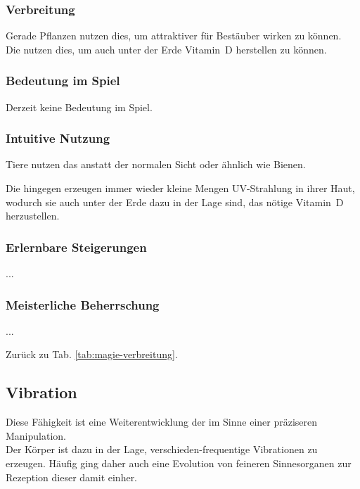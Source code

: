 \subsubsection{Verbreitung}
Gerade Pflanzen nutzen dies, um attraktiver für Bestäuber wirken zu können. \\
Die  nutzen dies, um auch unter der Erde Vitamin~D herstellen zu können.

\subsubsection{Bedeutung im Spiel}
Derzeit keine Bedeutung im Spiel.

\subsubsection{Intuitive Nutzung}
Tiere nutzen das \zB anstatt der normalen Sicht oder ähnlich wie Bienen.

Die  hingegen erzeugen immer wieder kleine Mengen UV-Strahlung in ihrer Haut, wodurch sie auch unter der Erde dazu in der Lage sind, das nötige Vitamin~D herzustellen.

\subsubsection{Erlernbare Steigerungen}
\begin{outline}
	\1 ...
\end{outline}

\subsubsection{Meisterliche Beherrschung} 
\begin{outline}
	\1 ...
\end{outline}
Zurück zu Tab. \ref{tab:magie-verbreitung}.



\subsection{Vibration}\label{magie:vibration}
Diese Fähigkeit ist eine Weiterentwicklung der  im Sinne einer präziseren Manipulation.\\
Der Körper ist dazu in der Lage, verschieden-frequentige Vibrationen zu erzeugen. 
Häufig ging daher auch eine Evolution von feineren Sinnesorganen zur Rezeption dieser damit einher.


